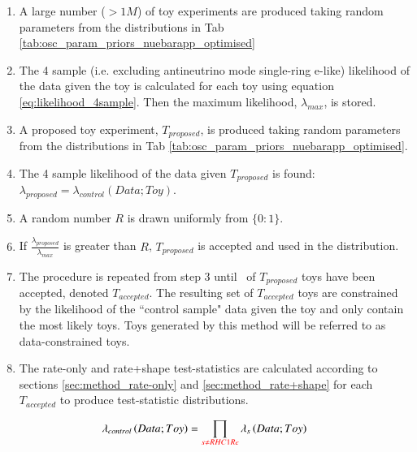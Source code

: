 \begin{enumerate}
	\item {\color{red}A large number ($>1M$) of toy experiments are produced taking random parameters from the distributions in Tab \ref{tab:osc_param_priors_nuebarapp_optimised}}
	
	\item The 4 sample (i.e. excluding antineutrino mode single-ring e-like) likelihood of the data given the toy is calculated for each toy using equation \ref{eq:likelihood_4sample}. Then the maximum likelihood, $\lambda_{max}$, is stored.
	
	\item {\color{red} A proposed toy experiment, $T_{proposed}$, is produced taking random parameters from the distributions in Tab \ref{tab:osc_param_priors_nuebarapp_optimised}.}
	
	\item \label{item:toy_gen_test} The 4 sample likelihood of the data given $T_{proposed}$ is found: {\color{red}$\lambda_{proposed} = \lambda_{control}(Data; Toy)$.} %
	
	\item A random number $R$ is drawn uniformly from $\{0:1\}$.
	
	\item If $\frac{\lambda_{proposed}}{\lambda_{max}}$ is greater than $R$, $T_{proposed}$ is accepted and used in the distribution.
	
	\item The procedure is repeated from step 3 until \NToysFakeDataRatePlusShape\ of $T_{proposed}$ toys have been accepted, denoted $T_{accepted}$. The resulting set of $T_{accepted}$ toys are constrained by the likelihood of the ``control sample" data given the toy and only contain the most likely toys. {\color{red} Toys generated by this method will be referred to as data-constrained toys. }
	
	\item The rate-only and rate+shape test-statistics are calculated according to sections \ref{sec:method_rate-only} and \ref{sec:method_rate+shape} for each $T_{accepted}$ to produce test-statistic distributions.
\end{enumerate}

\begin{equation} \label{eq:likelihood_4sample}
\lambda_{control} \left( Data; Toy \right) =
\prod_{{\color{red} s \ne RHC1Re }} \lambda_s \left( Data; Toy \right)
\end{equation}

